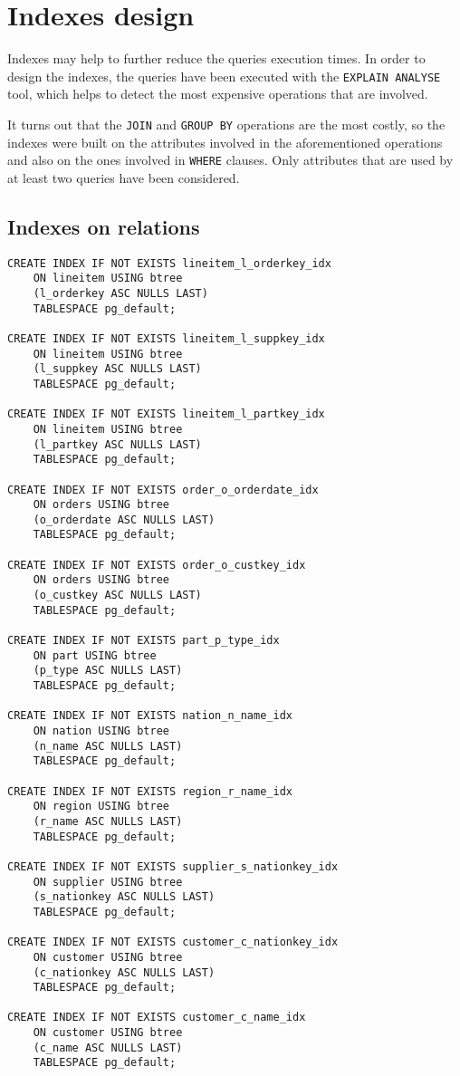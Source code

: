 

\section{Indexes design}
\label{sec:indexes}

Indexes may help to further reduce the queries execution times. In order to design the indexes, the queries have been executed with the \texttt{EXPLAIN ANALYSE} tool, which helps to detect the most expensive operations that are involved.

It turns out that the \texttt{JOIN} and \texttt{GROUP BY} operations are the most costly, so the indexes were built on the attributes involved in the aforementioned operations and also on the ones involved in \texttt{WHERE} clauses. Only attributes that are used by at least two queries have been considered.

\subsection{Indexes on relations}
\label{subsec:indexesdef}

\begin{lstlisting}
CREATE INDEX IF NOT EXISTS lineitem_l_orderkey_idx
    ON lineitem USING btree
    (l_orderkey ASC NULLS LAST)
    TABLESPACE pg_default;

CREATE INDEX IF NOT EXISTS lineitem_l_suppkey_idx
    ON lineitem USING btree
    (l_suppkey ASC NULLS LAST)
    TABLESPACE pg_default;
	
CREATE INDEX IF NOT EXISTS lineitem_l_partkey_idx
    ON lineitem USING btree
    (l_partkey ASC NULLS LAST)
    TABLESPACE pg_default;

CREATE INDEX IF NOT EXISTS order_o_orderdate_idx
    ON orders USING btree
    (o_orderdate ASC NULLS LAST)
    TABLESPACE pg_default;

CREATE INDEX IF NOT EXISTS order_o_custkey_idx
    ON orders USING btree
    (o_custkey ASC NULLS LAST)
    TABLESPACE pg_default;

CREATE INDEX IF NOT EXISTS part_p_type_idx
	ON part USING btree
	(p_type ASC NULLS LAST)
	TABLESPACE pg_default;

CREATE INDEX IF NOT EXISTS nation_n_name_idx
	ON nation USING btree
	(n_name ASC NULLS LAST)
	TABLESPACE pg_default;

CREATE INDEX IF NOT EXISTS region_r_name_idx
	ON region USING btree
	(r_name ASC NULLS LAST)
	TABLESPACE pg_default;

CREATE INDEX IF NOT EXISTS supplier_s_nationkey_idx
	ON supplier USING btree
	(s_nationkey ASC NULLS LAST)
	TABLESPACE pg_default;

CREATE INDEX IF NOT EXISTS customer_c_nationkey_idx
	ON customer USING btree
	(c_nationkey ASC NULLS LAST)
	TABLESPACE pg_default;

CREATE INDEX IF NOT EXISTS customer_c_name_idx
	ON customer USING btree
	(c_name ASC NULLS LAST)
	TABLESPACE pg_default;
\end{lstlisting}

